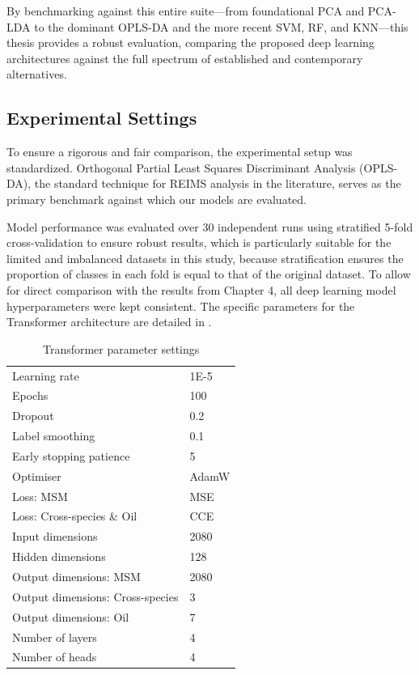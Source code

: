 By benchmarking against this entire suite—from foundational PCA and PCA-LDA to the dominant OPLS-DA and the more recent SVM, RF, and KNN—this thesis provides a robust evaluation, comparing the proposed deep learning architectures against the full spectrum of established and contemporary alternatives.

\subsection{Experimental Settings}

To ensure a rigorous and fair comparison, the experimental setup was standardized. Orthogonal Partial Least Squares Discriminant Analysis (OPLS-DA), the standard technique for REIMS analysis in the literature, serves as the primary benchmark against which our models are evaluated.

Model performance was evaluated over 30 independent runs using stratified 5-fold cross-validation to ensure robust results, which is particularly suitable for the limited and imbalanced datasets in this study, because stratification ensures the proportion of classes in each fold is equal to that of the original dataset. To allow for direct comparison with the results from Chapter 4, all deep learning model hyperparameters were kept consistent. The specific parameters for the Transformer architecture are detailed in .


\begin{table}
    \caption{Transformer parameter settings}
    \centering
    \begin{tabular}{ l l }
        \hline
        Learning rate & 1E-5 \\ 
        Epochs & 100 \\
        Dropout & 0.2 \\
        Label smoothing & 0.1 \\
        Early stopping patience & 5 \\
        Optimiser & AdamW \\
        Loss: MSM & MSE \\
        Loss: Cross-species \& Oil & CCE \\
        Input dimensions & 2080 \\ 
        Hidden dimensions & 128 \\
        Output dimensions: MSM & 2080 \\
        Output dimensions: Cross-species & 3 \\
        Output dimensions: Oil & 7 \\
        Number of layers & 4 \\
        Number of heads  & 4 \\
        \hline
    \end{tabular}
    \label{tab:transformer-parameters-chp-5}
\end{table}

